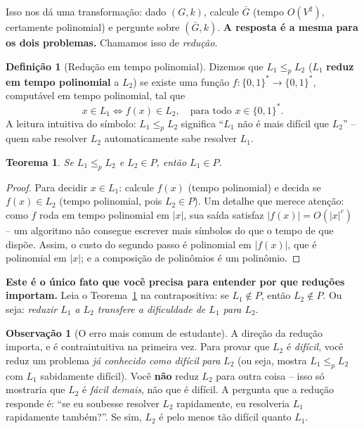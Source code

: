 \documentclass[9pt,a4paper]{extarticle}
\newcommand{\impt}[1]{\textcolor{important}{\textbf{#1}}}
\newcommand{\ntc}[1]{\textcolor{notice}{#1}}
\newtheorem{theorem}{Teorema}[section]
\theoremstyle{definition}
\newtheorem{definition}{Definição}[section]
\newtheorem{remark}{Observação}[section]
\begin{document}
Isso nos dá uma transformação: dado \((G,k)\), calcule \(\bar G\) (tempo \(O(V^2)\), certamente polinomial) e pergunte sobre \((\bar G, k)\). \impt{A resposta é a mesma para os dois problemas.} Chamamos isso de \emph{redução}.

\begin{definition}[Redução em tempo polinomial]\label{def:reducao}
Dizemos que \(L_1 \leq_p L_2\) (\(L_1\) \impt{reduz em tempo polinomial} a \(L_2\)) se existe uma função \(f: \{0,1\}^* \to \{0,1\}^*\), computável em tempo polinomial, tal que
\[
x \in L_1 \iff f(x) \in L_2, \quad \text{para todo } x \in \{0,1\}^*.
\]
A leitura intuitiva do símbolo: \(L_1 \leq_p L_2\) significa \enquote{\ntc{\(L_1\) não é mais difícil que \(L_2\)}} -- quem sabe resolver \(L_2\) automaticamente sabe resolver \(L_1\).
\end{definition}

\begin{theorem}\label{thm:reducao-transfere}
Se \(L_1 \leq_p L_2\) e \(L_2 \in P\), então \(L_1 \in P\).
\end{theorem}
\begin{proof}
Para decidir \(x \in L_1\): calcule \(f(x)\) (tempo polinomial) e decida se \(f(x) \in L_2\) (tempo polinomial, pois \(L_2 \in P\)). Um detalhe que merece atenção: como \(f\) roda em tempo polinomial em \(|x|\), sua saída satisfaz \(|f(x)| = O(|x|^c)\) -- um algoritmo não consegue escrever mais símbolos do que o tempo de que dispõe. Assim, o custo do segundo passo é polinomial em \(|f(x)|\), que é polinomial em \(|x|\); e a composição de polinômios é um polinômio.
\end{proof}

\impt{Este é o único fato que você precisa para entender por que reduções importam.} Leia o Teorema~\ref{thm:reducao-transfere} na contrapositiva: \ntc{se \(L_1 \notin P\), então \(L_2 \notin P\)}. Ou seja: \emph{reduzir \(L_1\) a \(L_2\) transfere a dificuldade de \(L_1\) para \(L_2\)}.

\begin{remark}[O erro mais comum de estudante]\label{rem:direcao}
A direção da redução importa, e é contraintuitiva na primeira vez. Para provar que \(L_2\) é \emph{difícil}, você reduz um problema \emph{já conhecido como difícil} \emph{para} \(L_2\) (ou seja, mostra \(L_1 \leq_p L_2\) com \(L_1\) sabidamente difícil). Você \textbf{não} reduz \(L_2\) para outra coisa -- isso só mostraria que \(L_2\) é \emph{fácil demais}, não que é difícil. A pergunta que a redução responde é: \enquote{se eu soubesse resolver \(L_2\) rapidamente, eu resolveria \(L_1\) rapidamente também?}. Se sim, \(L_2\) é pelo menos tão difícil quanto \(L_1\).
\end{remark}
\end{document}
